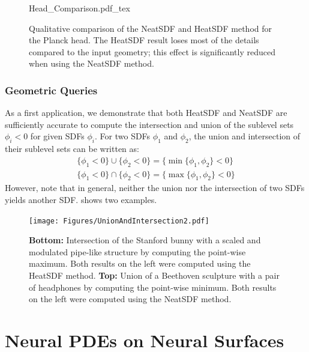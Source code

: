 \documentclass[draft,12pt,openany]{book}
\theoremstyle{plainnormal}
\theoremstyle{remark}
\begin{document}
\begin{figure}
    \centering
    \begingroup
    \sffamily
    \def\svgwidth{0.95\textwidth} %
    {Head_Comparison.pdf_tex}
    \endgroup
    \caption{Qualitative comparison of the NeatSDF and HeatSDF method for the Planck head. The HeatSDF result loses most of the details compared to the input geometry; this effect is significantly reduced when using the NeatSDF method.}
    \label{Head_comp}
\end{figure}
\FloatBarrier

\subsection{Geometric Queries}

As a first application, we demonstrate that both HeatSDF and NeatSDF are sufficiently accurate to compute the intersection and union of the sublevel sets ${\phi_i < 0}$ for given SDFs $\phi_i$. For two SDFs $\phi_1$ and $\phi_2$, the union and intersection of their sublevel sets can be written as:
\begin{align*}
    \{\phi_1 < 0\} \cup \{\phi_2 < 0\} = \{\min\{\phi_1, \phi_2\} < 0\} \\
    \{\phi_1 < 0\} \cap \{\phi_2 < 0\} = \{\max\{\phi_1, \phi_2\} < 0\}
\end{align*}
However, note that in general, neither the union nor the intersection of two SDFs yields another SDF.  shows two examples.
\begin{figure}
    \centering
    \texttt{[image: Figures/UnionAndIntersection2.pdf]}
    \caption{\textbf{Bottom:} Intersection of the Stanford bunny with a scaled and modulated pipe-like structure by computing the point-wise maximum. Both results on the left were computed using the HeatSDF method. \textbf{Top:} Union of a Beethoven sculpture with a pair of headphones by computing the point-wise minimum. Both results on the left were computed using the NeatSDF method.}\label{intersAndunion}
\end{figure}
\chapter{Neural PDEs on Neural Surfaces}\label{NPDEsonSurfaces} 
\end{document}
